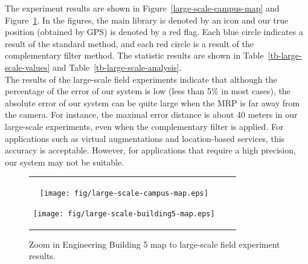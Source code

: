 The experiment results are shown in Figure~\ref{large-scale-campus-map} and Figure~\ref{large-scale-building5-map}. In the figures, the main library is denoted by an icon and our true position (obtained by GPS) is denoted by a red flag. Each blue circle indicates a result of the standard method, and each red circle is a result of the complementary filter method. The statistic results are shown in Table~\ref{tb-large-scale-values} and Table~\ref{tb-large-scale-analysis}.\\

The results of the large-scale field experiments indicate that although the percentage of the error of our system is low (less than 5\% in most cases), the absolute error of our system can be quite large when the MRP is far away from the camera. For instance, the maximal error distance is about 40 meters in our large-scale experiments, even when the complementary filter is applied. For applications such as virtual augmentations and location-based services, this accuracy is acceptable. However, for applications that require a high precision, our system may not be suitable. 
\begin{figure}[th!]
\begin{center}
 \begin{tabular}[t]{ccc}
    \begin{minipage}[t]{0.5\textwidth}
      \texttt{[image: fig/large-scale-campus-map.eps]}
      \caption{Campus map to large-scale field experiment results.}\label{large-scale-campus-map}
    \end{minipage}
    \quad \quad
    \begin{minipage}[t]{0.5\textwidth}
      \texttt{[image: fig/large-scale-building5-map.eps]}
      \caption{Zoom in Engineering Building 5 map to large-scale field experiment results.}\label{large-scale-building5-map}
    \end{minipage}
  \end{tabular}
\end{center}
\end{figure}